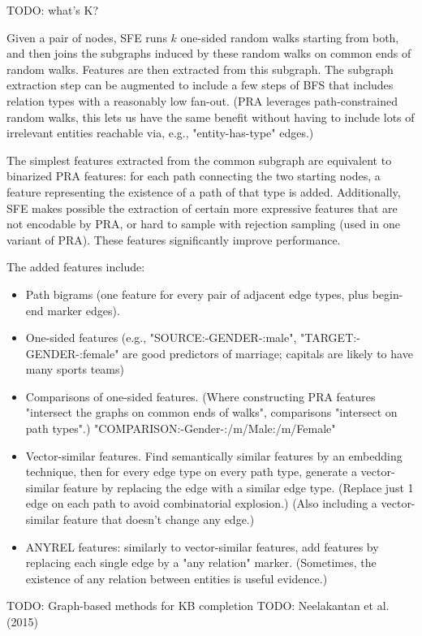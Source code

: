 TODO: what's K?

Given a pair of nodes, SFE runs $k$ one-sided random walks starting from both,
and then joins the subgraphs induced by these random walks on common ends of
random walks. Features are then extracted from this subgraph.
The subgraph extraction step can be augmented to include a few steps of BFS
that includes relation types with a reasonably low fan-out.
(PRA leverages path-constrained random walks, this lets us have the same
benefit without having to include lots of irrelevant entities reachable via,
e.g., "entity-has-type" edges.)

The simplest features extracted from the common subgraph are equivalent to
binarized PRA features: for each path connecting the two starting nodes, a
feature representing the existence of a path of that type is added.
Additionally, SFE makes possible the extraction of certain more expressive
features that are not encodable by PRA, or hard to sample with rejection
sampling (used in one variant of PRA). These features significantly improve
performance.

The added features include:
\begin{itemize}
\item Path bigrams (one feature for every pair of adjacent
edge types, plus begin-end marker edges).
\item One-sided features (e.g., "SOURCE:-GENDER-:male", "TARGET:-GENDER-:female"
are good predictors of marriage; capitals are likely to have many sports teams)
\item Comparisons of one-sided features. (Where constructing PRA features
"intersect the graphs on common ends of walks", comparisons "intersect on
path types".) "COMPARISON:-Gender-:/m/Male:/m/Female"
\item Vector-similar features. Find semantically similar features by an
embedding technique, then for every edge type on every path type, generate
a vector-similar feature by replacing the edge with a similar edge type.
(Replace just 1 edge on each path to avoid combinatorial explosion.)
(Also including a vector-similar feature that doesn't change any edge.)
\item ANYREL features: similarly to vector-similar features, add features
by replacing each single edge by a "any relation" marker. (Sometimes, the
existence of any relation between entities is useful evidence.)
\end{itemize}

TODO: Graph-based methods for KB completion
TODO: Neelakantan et al. (2015)

